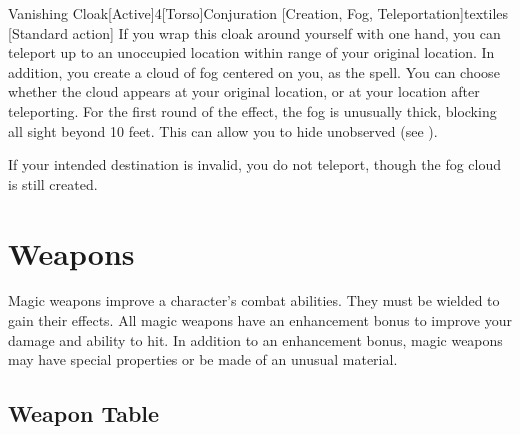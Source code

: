         \begin{magicitemdef}{Vanishing Cloak}[Active]{4}[Torso]{Conjuration [Creation, Fog, Teleportation]}{textiles}
            [Standard action] If you wrap this cloak around yourself with one hand, you can teleport up to an unoccupied location within \rngmed range of your original location.
            In addition, you create a cloud of fog centered on you, as the  spell.
            You can choose whether the cloud appears at your original location, or at your location after teleporting.
            For the first round of the effect, the fog is unusually thick, blocking all sight beyond 10 feet.
            This can allow you to hide unobserved (see ).

            If your intended destination is invalid, you do not teleport, though the fog cloud is still created.
        \end{magicitemdef}

\section{Weapons}
    Magic weapons improve a character's combat abilities.
    They must be wielded to gain their effects.
    All magic weapons have an enhancement bonus to improve your damage and ability to hit.
    In addition to an enhancement bonus, magic weapons may have special properties or be made of an unusual material.

    \subsection{Weapon Table}

